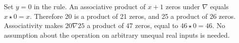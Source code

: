Set $y=0$ in the rule. An associative product of $x+1$ zeros under $\nabla$ equals $x\star0=x$. Therefore 20 is a product of 21 zeros, and 25 a product of 26 zeros. Associativity makes $20\nabla25$ a product of 47 zeros, equal to $46\star0=\boxed{46}$. No assumption about the operation on arbitrary unequal real inputs is needed.
